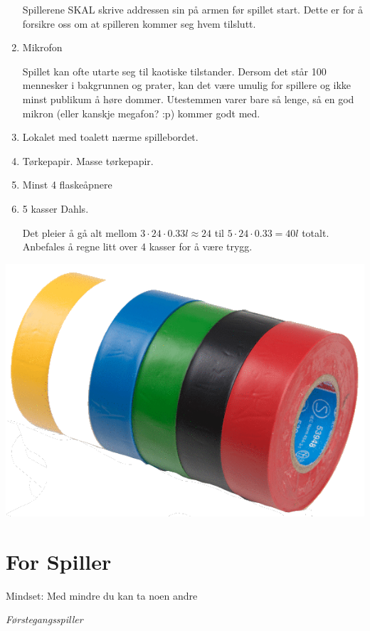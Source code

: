 \documentclass[10pt,a4paper,norsk,openany]{book}
\begin{document}
\begin{enumerate}
    Spillerene SKAL skrive addressen sin på armen før spillet start. Dette er for å
    forsikre oss om at spilleren kommer seg hvem tilslutt.

  \item Mikrofon

    Spillet kan ofte utarte seg til kaotiske tilstander. Dersom det står 100
    mennesker i bakgrunnen og prater, kan det være umulig for spillere og ikke minst
    publikum å høre dommer. Utestemmen varer bare så lenge, så en god mikron (eller
    kanskje megafon? :p) kommer godt med.

  \item Lokalet med toalett nærme spillebordet.

  \item Tørkepapir. Masse tørkepapir.

  \item Minst 4 flaskeåpnere

  \item 5 kasser Dahls.

    Det pleier å gå alt mellom $3 \cdot 24 \cdot 0.33l \approx 24 $ til $5 \cdot 24
    \cdot 0.33 = 40l$ totalt. Anbefales å regne litt over 4 kasser for å være trygg.

\end{enumerate}

\includegraphics[scale=0.2]{sportstape.png}

\chapter{For Spiller}

\epigraph{Mindset:  Med mindre du kan ta
  noen andre}{\textit{Førstegangsspiller}}
\end{document}

